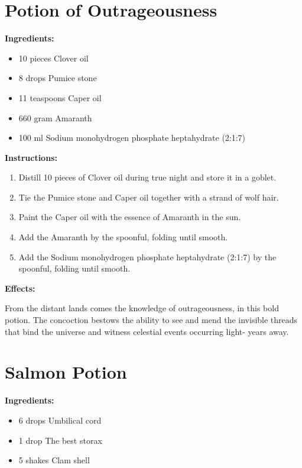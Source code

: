 \documentclass{article}
\begin{document}
\newpage
\section*{Potion of Outrageousness}

\textbf{Ingredients:}

\begin{itemize}
  \item 10 pieces Clover oil
  \item 8 drops Pumice stone
  \item 11 teaspoons Caper oil
  \item 660 gram Amaranth
  \item 100 ml Sodium monohydrogen phosphate heptahydrate (2:1:7)
\end{itemize}

\textbf{Instructions:}

\begin{enumerate}
  \item Distill 10 pieces of Clover oil during true night and store it in a goblet.
  \item Tie the Pumice stone and Caper oil together with a strand of wolf hair.
  \item Paint the Caper oil with the essence of Amaranth in the sun.
  \item Add the Amaranth by the spoonful, folding until smooth.
  \item Add the Sodium monohydrogen phosphate heptahydrate (2:1:7) by the spoonful, folding until smooth.
\end{enumerate}

\textbf{Effects:}

From the distant lands comes the knowledge of outrageousness, in this bold potion. The concoction bestows the ability to see and mend the invisible threads that bind the universe and witness celestial events occurring light- years away.

\newpage
\section*{Salmon Potion}

\textbf{Ingredients:}

\begin{itemize}
  \item 6 drops Umbilical cord
  \item 1 drop The best storax
  \item 5 shakes Clam shell
\end{itemize}
\end{document}
